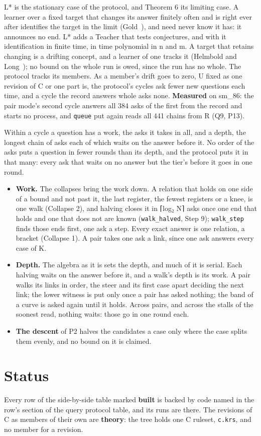 L* is the stationary case of the protocol, and Theorem 6 its limiting case. A learner over a fixed target that changes its answer finitely often and is right ever after identifies the target in the limit (Gold~\cite{src:Gold-1967}), and need never know it has: it announces no end. L* adds a Teacher that tests conjectures, and with it identification in finite time, in time polynomial in n and m. A target that retains changing is a drifting concept, and a learner of one tracks it (Helmbold and Long~\cite{src:Helmbold-Long-1994}); no bound on the whole run is owed, since the run has no whole. The protocol tracks its members. As a member's drift goes to zero, U fixed as one revision of C or one part is, the protocol's cycles ask fewer new questions each time, and a cycle the record answers whole asks none. \textbf{Measured} on sm\_\allowbreak{}86: the pair mode's second cycle answers all 384 asks of the first from the record and starts no process, and \texttt{queue} put again reads all 441 chains from R (Q9, P13).

Within a cycle a question has a work, the asks it takes in all, and a depth, the longest chain of asks each of which waits on the answer before it. No order of the asks puts a question in fewer rounds than its depth, and the protocol puts it in that many: every ask that waits on no answer but the tier's before it goes in one round.

\begin{itemize}
\item \textbf{Work.} The collapses bring the work down. A relation that holds on one side of a bound and not past it, the last register, the fewest registers or a knee, is one walk (Collapse 2), and halving closes it in ⌈log₂ N⌉ asks once one end that holds and one that does not are known (\texttt{walk\_\allowbreak{}halved}, Step 9); \texttt{walk\_\allowbreak{}step} finds those ends first, one ask a step. Every exact answer is one relation, a bracket (Collapse 1). A pair takes one ask a link, since one ask answers every case of K.
\item \textbf{Depth.} The algebra as it is sets the depth, and much of it is serial. Each halving waits on the answer before it, and a walk's depth is its work. A pair walks its links in order, the steer and its first case apart deciding the next link; the lower witness is put only once a pair has asked nothing; the band of a curve is asked again until it holds. Across pairs, and across the stalls of the soonest read, nothing waits: those go in one round each.
\item \textbf{The descent} of P2 halves the candidates a case only where the case splits them evenly, and no bound on it is claimed.
\end{itemize}

\section{\texorpdfstring{Status}{Status}}

Every row of the side-by-side table marked \textbf{built} is backed by code named in the row's section of the query protocol table, and its runs are there. The revisions of C as members of their own are \textbf{theory}: the tree holds one C ruleset, \texttt{c.\allowbreak{}krs}, and no member for a revision.
